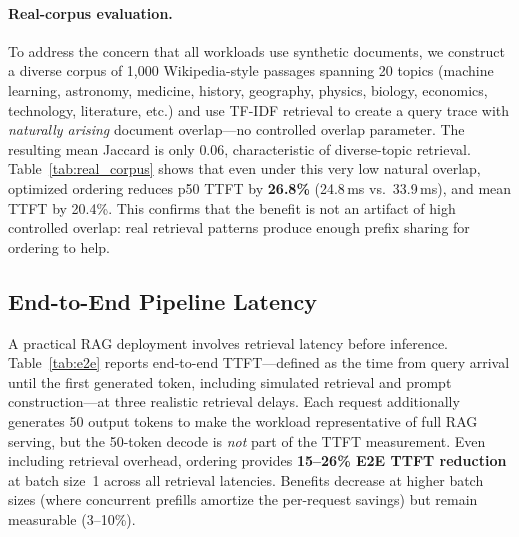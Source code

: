 \documentclass{article}
\begin{document}
\paragraph{Real-corpus evaluation.}
\label{sec:real_corpus}

To address the concern that all workloads use synthetic documents, we construct a diverse corpus of 1{,}000 Wikipedia-style passages spanning 20 topics (machine learning, astronomy, medicine, history, geography, physics, biology, economics, technology, literature, etc.) and use TF-IDF retrieval to create a query trace with \emph{naturally arising} document overlap---no controlled overlap parameter. The resulting mean Jaccard is only $0.06$, characteristic of diverse-topic retrieval. Table~\ref{tab:real_corpus} shows that even under this very low natural overlap, optimized ordering reduces p50 TTFT by \textbf{26.8\%} (24.8\,ms vs.\ 33.9\,ms), and mean TTFT by 20.4\%. This confirms that the benefit is not an artifact of high controlled overlap: real retrieval patterns produce enough prefix sharing for ordering to help.

\begin{table}[t]
\caption{Real-corpus evaluation with TF-IDF retrieval (RTX 4090, 200 queries, 1000 Wikipedia-style passages / 20 topics; mean Jaccard = 0.06, no controlled overlap).}
\label{tab:real_corpus}
\centering
\small
{}
\vspace{-0.5em}
\end{table}

\subsection{End-to-End Pipeline Latency}
\label{sec:e2e}

A practical RAG deployment involves retrieval latency before inference. Table~\ref{tab:e2e} reports end-to-end TTFT---defined as the time from query arrival until the first generated token, including simulated retrieval and prompt construction---at three realistic retrieval delays. Each request additionally generates 50 output tokens to make the workload representative of full RAG serving, but the 50-token decode is \emph{not} part of the TTFT measurement. Even including retrieval overhead, ordering provides \textbf{15--26\% E2E TTFT reduction} at batch size~1 across all retrieval latencies. Benefits decrease at higher batch sizes (where concurrent prefills amortize the per-request savings) but remain measurable (3--10\%).
\end{document}
